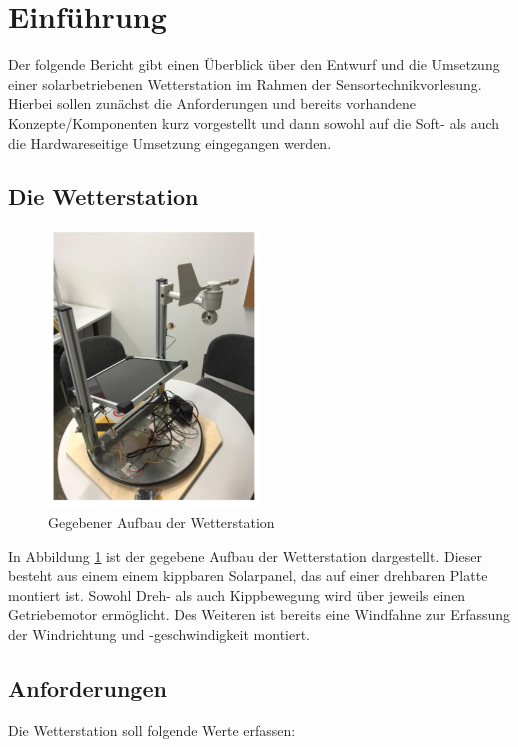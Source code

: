 \section{Einführung}\label{sec:einfuehrung}
Der folgende Bericht gibt einen Überblick über den Entwurf und die Umsetzung einer solarbetriebenen Wetterstation im Rahmen der Sensortechnikvorlesung. Hierbei sollen zunächst die Anforderungen und bereits vorhandene Konzepte/Komponenten kurz vorgestellt und dann sowohl auf die Soft- als auch die Hardwareseitige Umsetzung eingegangen werden.

\subsection{Die Wetterstation}\label{subsec:Wetterstation}
\begin{figure}[H]
  \centering
  \includegraphics[width=0.5\textwidth]{./img/Wetterstation.png}
  \caption{Gegebener Aufbau der Wetterstation}\label{fig.wetterstation}
\end{figure}

In Abbildung \ref{fig.wetterstation} ist der gegebene Aufbau der Wetterstation dargestellt. Dieser besteht aus einem einem kippbaren Solarpanel, das auf einer drehbaren Platte montiert ist. Sowohl Dreh- als auch Kippbewegung wird über jeweils einen Getriebemotor ermöglicht. Des Weiteren ist bereits eine Windfahne zur Erfassung der Windrichtung und -geschwindigkeit montiert.

\subsection{Anforderungen}\label{subsec:Anforderungen}
Die Wetterstation soll folgende Werte erfassen:

